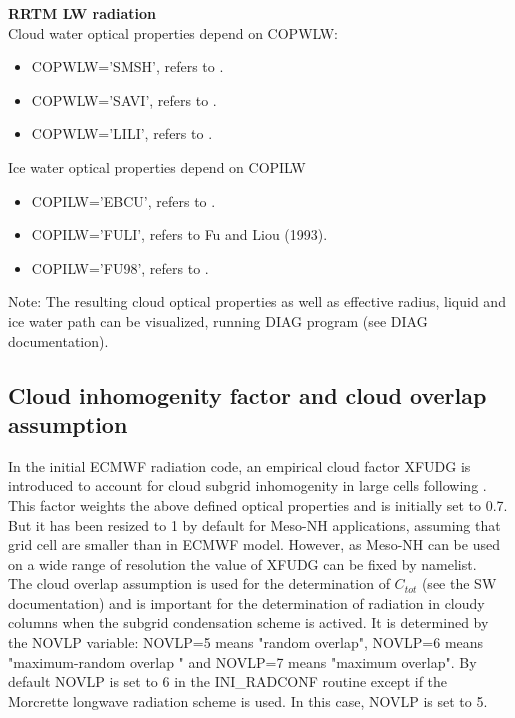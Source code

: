 {\bf RRTM LW radiation} \\

Cloud water optical properties depend on COPWLW:
\begin{itemize}
\item COPWLW='SMSH', refers to \citet{Smith1992}.

\item COPWLW='SAVI', refers to \citet{Savijarvi1997}.

\item COPWLW='LILI', refers to \citet{Lindner2000}.

\end{itemize}


Ice water optical properties depend on COPILW

\begin{itemize}
\item COPILW='EBCU', refers to \citet{Ebert1992}.

\item COPILW='FULI', refers to Fu and Liou (1993).

\item COPILW='FU98', refers to \citet{Fu1998}.
\end{itemize}

Note: The resulting cloud optical properties as well as effective radius, liquid and ice water path can be visualized, running DIAG program (see DIAG documentation).



\subsection{Cloud inhomogenity factor and cloud overlap assumption}

In the initial ECMWF radiation code, an empirical cloud factor XFUDG is introduced to account for cloud subgrid inhomogenity in large cells following \citet{Tiedtke1996}. This factor weights the above defined optical properties and is initially set to 0.7. But it has been resized to 1 by default for Meso-NH applications, assuming that grid cell are smaller than in ECMWF model. However, as Meso-NH can be used on a wide range of resolution the value of XFUDG can be fixed by namelist.\\ 

The cloud overlap  assumption is used for the determination of $C_{tot}$ (see the SW documentation) and is important for the determination of radiation in cloudy columns when the subgrid condensation scheme is actived. It is determined by the NOVLP variable: NOVLP=5 means "random overlap", NOVLP=6 means "maximum-random overlap " and NOVLP=7 means "maximum overlap". By default NOVLP is set to 6 in the INI\_RADCONF routine except if the Morcrette longwave radiation scheme is used. In this case, NOVLP is set to 5. 


